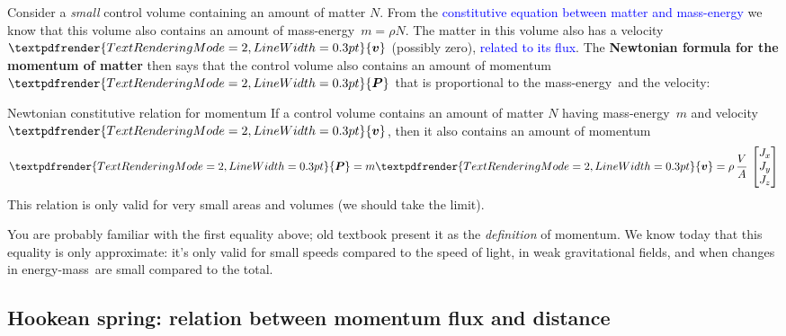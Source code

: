\documentclass[a4paper,12pt,%
onecolumn,oneside,titlepage,%
british%
]{memoir}
\renewcommand*{\bm}[1]{\textpdfrender{TextRenderingMode=2,LineWidth=0.3pt}{\boldsymbol{#1}}}
\renewcommand*{\|}[1][]{\nonscript\:#1\vert\nonscript\:\mathopen{}}
\newcommand*{\sect}{\S}%
\renewcommand*{\autoref}[2]{\sidepar{\vspace{-1ex}\footnotesize{\color{blue}\faIcon{%
reply%
}\enspace\sect\,\ref{#1} page\,\pageref{#1}}}\textcolor{blue}{#2}}
\newcommand*{\yv}{\bm{v}}
\newcommand*{\yN}{N}
\newcommand*{\yrho}{\rho}
\newcommand*{\yM}{m}%
\newcommand*{\yP}{\bm{P}}
\newcommand*{\energym}{energy-mass}
\newcommand*{\masse}{mass-energy}
\begin{document}
Consider a \emph{small} control volume containing an amount of matter $\yN$. From the \autoref{sec:const_matter_mass}{constitutive equation between matter and \masse} we know that this volume also contains an amount of \masse\ $\yM=\yrho\yN$. The matter in this volume also has a velocity $\yv$ (possibly zero), \autoref{sec:fluxes_velocities}{related to its flux}. The \textbf{Newtonian formula for the momentum of matter} then says that the control volume also contains an amount of momentum $\yP$ that is proportional to the \masse\ and the velocity:
\begin{definition}{Newtonian constitutive relation for momentum}
If a control volume contains an amount of matter $\yN$ having \masse\ $\yM$ and velocity $\yv$, then it also contains an amount of momentum
  \begin{equation}
    \label{eq:matter_momentum_Newton}
    \yP = \yM\yv = \yrho\, \frac{V}{A}\,
  \begin{bmatrix}
    J_{x}\\J_{y}\\J_{z}
  \end{bmatrix}
\end{equation}
This relation is only valid for very small areas and volumes (we should take the limit).
\end{definition}

You are probably familiar with the first equality above; old textbook present it as the \emph{definition} of momentum. We know today that this equality is only approximate: it's only valid for small speeds compared to the speed of light, in weak gravitational fields, and when changes in \energym\ are small compared to the total.

\subsection{Hookean spring: relation between momentum flux and distance}
\label{sec:hooke}
\end{document}
